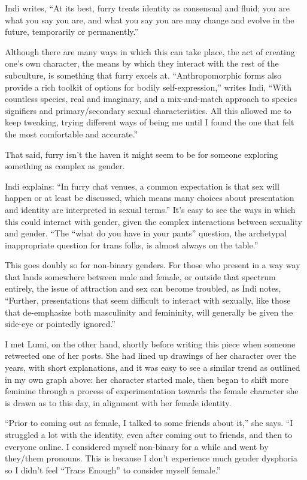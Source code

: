 Indi writes, ``At its best, furry treats identity as consensual and fluid; you are what you say you are, and what you say you are may change and evolve in the future, temporarily or permanently.''

Although there are many ways in which this can take place, the act of creating one's own character, the means by which they interact with the rest of the subculture, is something that furry excels at. ``Anthropomorphic forms also provide a rich toolkit of options for bodily self-expression,'' writes Indi, ``With countless species, real and imaginary, and a mix-and-match approach to species signifiers and primary/secondary sexual characteristics. All this allowed me to keep tweaking, trying different ways of being me until I found the one that felt the most comfortable and accurate.''

That said, furry isn't the haven it might seem to be for someone exploring something as complex as gender.

Indi explains: ``In furry chat venues, a common expectation is that sex will happen or at least be discussed, which means many choices about presentation and identity are interpreted in sexual terms.'' It's easy to see the ways in which this could interact with gender, given the complex interactions between sexuality and gender. ``The ``what do you have in your pants'' question, the archetypal inappropriate question for trans folks, is almost always on the table.''

This goes doubly so for non-binary genders. For those who present in a way way that lands somewhere between male and female, or outside that spectrum entirely, the issue of attraction and sex can become troubled, as Indi notes, ``Further, presentations that seem difficult to interact with sexually, like those that de-emphasize both masculinity and femininity, will generally be given the side-eye or pointedly ignored.''

I met Lumi, on the other hand, shortly before writing this piece when someone retweeted one of her posts. She had lined up drawings of her character over the years, with short explanations, and it was easy to see a similar trend as outlined in my own graph above: her character started male, then began to shift more feminine through a process of experimentation towards the female character she is drawn as to this day, in alignment with her female identity.

``Prior to coming out as female, I talked to some friends about it,'' she says. ``I struggled a lot with the identity, even after coming out to friends, and then to everyone online. I considered myself non-binary for a while and went by they/them pronouns. This is because I don't experience much gender dysphoria so I didn't feel ``Trans Enough'' to consider myself female.''


